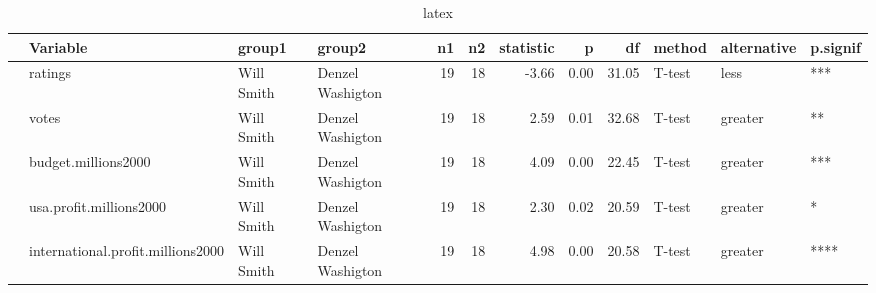 \begin{table}[ht]
\centering
\hspace*{-3cm}
\begin{tabular}{rlllrrrrrlll}
  \hline
 & Variable & group1 & group2 & n1 & n2 & statistic & p & df & method & alternative & p.signif \\ 
  \hline
& ratings & Will Smith & Denzel Washigton &  19 &  18 & -3.66 & 0.00 & 31.05 & T-test & less & *** \\ 
& votes & Will Smith & Denzel Washigton &  19 &  18 & 2.59 & 0.01 & 32.68 & T-test & greater & ** \\ 
& budget.millions2000 & Will Smith & Denzel Washigton &  19 &  18 & 4.09 & 0.00 & 22.45 & T-test & greater & *** \\ 
& usa.profit.millions2000 & Will Smith & Denzel Washigton &  19 &  18 & 2.30 & 0.02 & 20.59 & T-test & greater & * \\ 
& international.profit.millions2000 & Will Smith & Denzel Washigton &  19 &  18 & 4.98 & 0.00 & 20.58 & T-test & greater & **** \\ 
   \hline
\end{tabular}
\caption{latex} 
\end{table}
